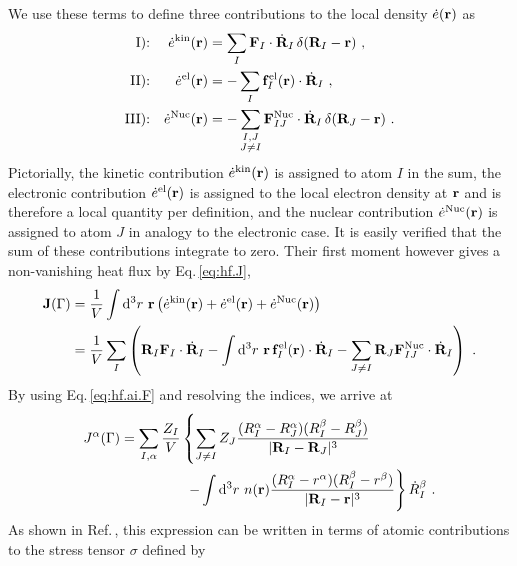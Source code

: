 We use these terms to define three contributions to the local density $\dot{e} ({\bf r})$ as
\begin{subequations}
\begin{align}
	\text{I):}&&
		\dot{e}^{\rm kin} ({\bf r}) &= \sum_I {\bf F}_I \cdot \dot{{\bf R}}_I \, \delta ({\bf R}_I - {\bf r})~, \\
	\text{II):}&&
		\dot{e}^{\rm el} ({\bf r})  &= -\sum_{I} {\bf f}_I^{\rm el} ({\bf r}) \cdot \dot{{\bf R}}_I~, \\
	\text{III):}&&
		\dot{e}^{\rm Nuc} ({\bf r}) &= -\sum_{\substack{I, J \\ J \neq I}} {\bf F}^{\rm Nuc}_{IJ} \cdot \dot{{\bf R}}_I \, \delta ({\bf R}_J - {\bf r})~.
\end{align}
\label{eq:hf.ai.densities}
\end{subequations}
Pictorially, the kinetic contribution $\dot{e}^{\rm kin} ({\bf r})$ is assigned to atom $I$ in the sum, the electronic contribution $\dot{e}^{\rm el} ({\bf r})$ is assigned to the local electron density at ${\bf r}$ and is therefore a local quantity per definition, and the nuclear contribution $\dot{e}^{\rm Nuc} ({\bf r})$ is assigned to atom $J$ in analogy to the electronic case. It is easily verified that the sum of these contributions integrate to zero. Their first moment however gives a non-vanishing heat flux by Eq.\,\eqref{eq:hf.J},
\begin{align}
	{\bf J} (\Gamma)
		&= \frac{1}{V} \int {\rm d}^3 r ~ {\bf r} \left( \dot{e}^{\rm kin} ({\bf r}) + \dot{e}^{\rm el} ({\bf r}) + \dot{e}^{\rm Nuc} ({\bf r})  \right) \\
		&= \frac{1}{V} \sum_I
			\left( 
				{\bf R}_I {\bf F}_I \cdot \dot{{\bf R}}_I
				- \int {\rm d}^3 r ~ {\bf r} \, {\bf f}_I^{\rm el} ({\bf r}) \cdot \dot{{\bf R}}_I
				- \sum_{J \neq I} {\bf R}_J {\bf F}^{\rm Nuc}_{IJ} \cdot \dot{{\bf R}}_I
			\right)~.
\end{align}
By using Eq.\,\eqref{eq:hf.ai.F} and resolving the indices, we arrive at
\begin{align}
	J^\alpha (\Gamma) \nonumber
		=  \sum_{I, \alpha} \frac{Z_I}{V}
			&\left\{ 
				\sum_{J \neq I} Z_J \frac{(R_I^\alpha - R_J^\alpha) (R_I^\beta - R_J^\beta)}{\lvert \b R_I - \b R_J \rvert^3} \right. \nonumber \\
				&~\left.- \int \d^3 r ~ n(\b r) \frac{(R_I^\alpha - r^\alpha) (R_I^\beta - r^\beta)}{\lvert \b R_I - \b r \vert^3}
			\right\}
			\dot{R}^\beta_I~.
	\label{eq:hf.ai.J}
\end{align}
As shown in Ref.\,\cite{Carbogno2016}, this expression can be written in terms of atomic contributions to the stress tensor $\sigma$ defined by
